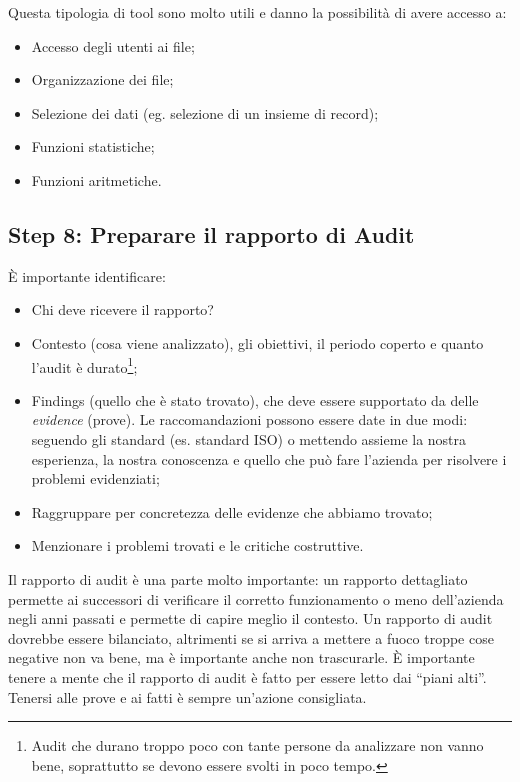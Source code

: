 
Questa tipologia di tool sono molto utili e danno la possibilità di avere
accesso a:
\begin{itemize}
\item Accesso degli utenti ai file;
\item Organizzazione dei file;
\item Selezione dei dati (eg. selezione di un insieme di record);
\item Funzioni statistiche;
\item Funzioni aritmetiche.
\end{itemize}

\subsection{Step 8: Preparare il rapporto di Audit}

È importante identificare:
\begin{itemize}
\item Chi deve ricevere il rapporto?
\item Contesto (cosa viene analizzato), gli obiettivi, il periodo coperto e
quanto l'audit è durato\footnote{Audit che durano troppo poco con tante persone
da analizzare non vanno bene, soprattutto se devono essere svolti in poco
tempo.};
\item Findings (quello che è stato trovato), che deve essere supportato da delle
\emph{evidence} (prove). Le raccomandazioni possono essere date in due modi:
seguendo gli standard (es. standard ISO) o mettendo assieme la nostra
esperienza, la nostra conoscenza e quello che può fare l'azienda per risolvere i
problemi evidenziati;
\item Raggruppare per concretezza delle evidenze che abbiamo trovato;
\item Menzionare i problemi trovati e le critiche costruttive.
\end{itemize}

Il rapporto di audit è una parte molto importante: un rapporto dettagliato
permette ai successori di verificare il corretto funzionamento o meno
dell'azienda negli anni passati e permette di capire meglio il contesto. Un
rapporto di audit dovrebbe essere bilanciato, altrimenti se si arriva a mettere
a fuoco troppe cose negative non va bene, ma è importante anche non trascurarle.
È importante tenere a mente che il rapporto di audit è fatto per essere letto
dai ``piani alti''. Tenersi alle prove e ai fatti è sempre un'azione
consigliata.

